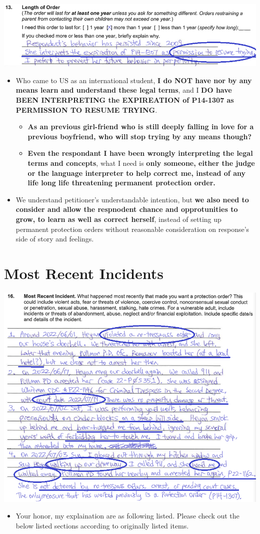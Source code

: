 \documentclass[9pt, b5paper]{article}
\begin{document}
\includegraphics[width=.9\linewidth]{./pic/dearCousin_20220919_153711.png}
\begin{itemize}
\item Who came to US as an international student, \textbf{I do NOT have nor by any means learn and understand these legal terms}, and I \textbf{DO have BEEN INTERPRETING the EXPIREATION of P14-1307 as PERMISSION TO RESUME TRYING}. 
\begin{itemize}
\item \textbf{As an previous girl-friend who is still deeply falling in love for a previous boyfriend, who will stop trying by any means though?}
\item \textbf{Even the respondant I have been wrongly interpreting the legal terms and concepts}, what I need is \textbf{only someone, either the judge or the language interpreter to help correct me, instead of any life long life threatening permanent protection order.}
\end{itemize}
\item We understand petitioner's understandable intention, but \textbf{we also need to consider and allow the respnodent chance and opprotunities to grow, to learn as well as correct herself}, instead of setting up permanent protection orders without reasonable consideration on response's side of story and feelings.
\end{itemize}

\section{Most Recent Incidents}
\label{sec-4}

\includegraphics[width=.9\linewidth]{./pic/dearCousin_20220919_183412.png}
\begin{itemize}
\item Your honor, my explaination are as following listed. Please check out the below listed sections according to originally listed items.
\end{itemize}
\end{document}

